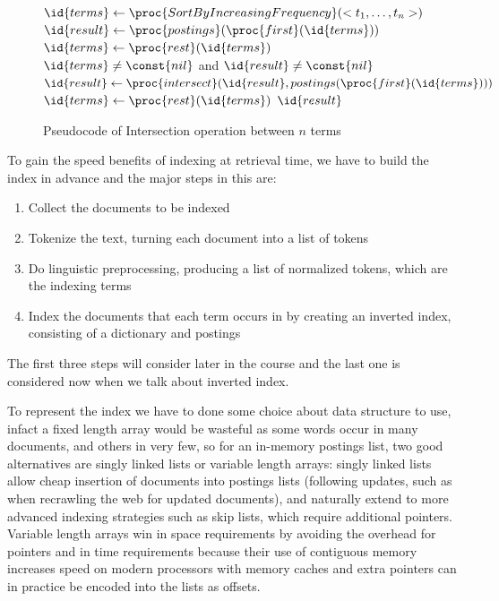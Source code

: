 \begin{figure}
    \begin{codebox}
	    \li $\id{terms} \gets \proc{SortByIncreasingFrequency}(<t_1, \dots, t_n>)$
	    \li $\id{result} \gets \proc{postings} (\proc{first}(\id{terms}))$
	    \li $\id{terms} \gets \proc{rest} (\id{terms})$
	    \li \While $\id{terms} \neq \const{nil}$ and $\id{result} \neq \const{nil}$
	    	\Do
	    \li $\id{result} \gets \proc{intersect} (\id{result}, postings(\proc{first} (\id{terms})))$
	    \li $\id{terms} \gets \proc{rest} (\id{terms})$
	        \End
	    \li \Return $\id{result}$
    \end{codebox}
    \caption{Pseudocode of Intersection operation between $n$ terms}
    \label{alg:intersectionTerms}
\end{figure}
To gain the speed benefits of indexing at retrieval time, we have to build the index in advance
and the major steps in this are:
\begin{enumerate}
    \item Collect the documents to be indexed
    \item Tokenize the text, turning each document into a list of tokens
    \item Do linguistic preprocessing, producing a list of normalized tokens, which are the indexing terms
    \item Index the documents that each term occurs in by creating an inverted index,
          consisting of a dictionary and postings
\end{enumerate}
The first three steps will consider later in the course and the last one is considered now when we talk about 
inverted index.

To represent the index we have to done some choice about data structure to use, infact 
a fixed length array would be wasteful as some words occur in many documents, and others in very few,
so for an in-memory postings list, two good alternatives are singly linked lists or variable length arrays:
singly linked lists allow cheap insertion of documents into postings lists (following updates,
such as when recrawling the web for updated documents), and naturally extend to more advanced indexing strategies
such as skip lists, which require additional pointers.\newline
Variable length arrays win in space requirements by avoiding the overhead for pointers and in
time requirements because their use of contiguous memory increases speed on modern processors with memory caches
and extra pointers can in practice be encoded into the lists as offsets.

